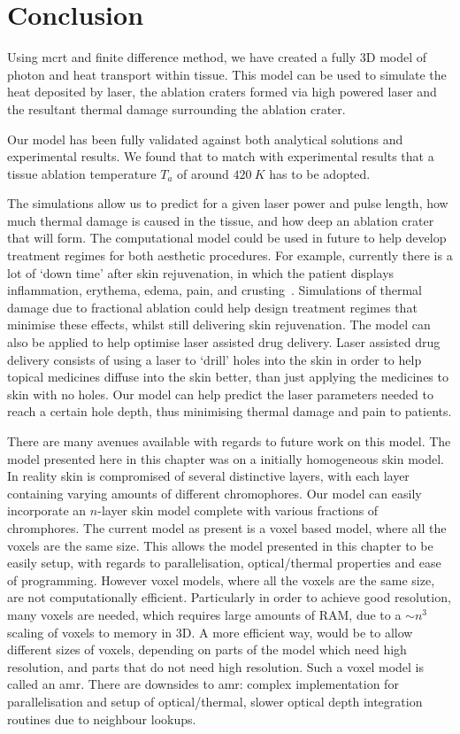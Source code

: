 \section{Conclusion}

Using \gls{mcrt} and finite difference method, we have created a fully 3D model of photon and heat transport within tissue. This model can be used to simulate the heat deposited by laser, the ablation craters formed via high powered laser and the resultant thermal damage surrounding the ablation crater.

Our model has been fully validated against both analytical solutions and experimental results. We found that to match with experimental results that a tissue ablation temperature $T_a$ of around $420~K$ has to be adopted.

The simulations allow us to predict for a given laser power and pulse length, how much thermal damage is caused in the tissue, and how deep an ablation crater that will form. The computational model could be used in future to help develop treatment regimes for both aesthetic procedures. For example, currently there is a lot of `down time' after skin rejuvenation, in which the patient displays inflammation, erythema, edema, pain, and crusting~\cite{lapidoth2014fractional,trelles2011safe,kohl2015fractional}. Simulations of thermal damage due to fractional ablation could help design treatment regimes that minimise these effects, whilst still delivering skin rejuvenation.
The model can also be applied to help optimise laser assisted drug delivery. Laser assisted drug delivery consists of using a laser to `drill' holes into the skin in order to help topical medicines diffuse into the skin better, than just applying the medicines to skin with no holes. Our model can help predict the laser parameters needed to reach a certain hole depth, thus minimising thermal damage and pain to patients.

There are many avenues available with regards to future work on this model. The model presented here in this chapter was on a initially homogeneous skin model. In reality skin is compromised of several distinctive layers, with each layer containing varying amounts of different chromophores. Our model can easily incorporate an $n$-layer skin model complete with various fractions of chromphores.
The current model as present is a voxel based model, where all the voxels are the same size. This allows the model presented in this chapter to be easily setup, with regards to parallelisation, optical/thermal properties and ease of programming. However voxel models, where all the voxels are the same size, are not computationally efficient. Particularly in order to achieve good resolution, many voxels are needed, which requires large amounts of RAM, due to a $\sim n^3$ scaling of voxels to memory in 3D. A more efficient way, would be to allow different sizes of voxels, depending on parts of the model which need high resolution, and parts that do not need high resolution. Such a voxel model is called an \gls{amr}. There are downsides to \gls{amr}: complex implementation for parallelisation and setup of optical/thermal, slower optical depth integration routines due to neighbour lookups.


